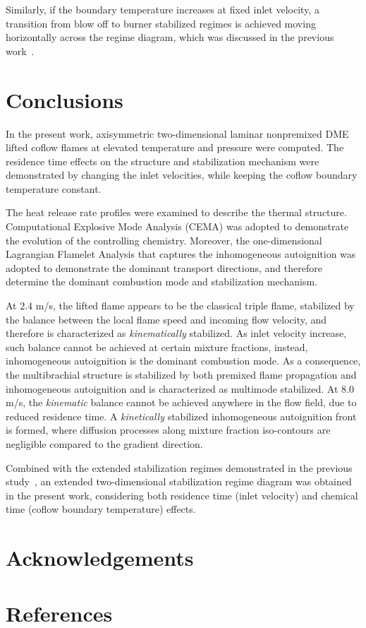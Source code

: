 \documentclass{wssci}
\begin{document}
Similarly, if the boundary temperature increases at fixed inlet velocity, a transition from blow off to burner stabilized regimes is achieved moving horizontally across the regime diagram, which was discussed in the previous work~\cite{deng15}.     


\section{Conclusions}

In the present work, axisymmetric two-dimensional laminar nonpremixed DME lifted coflow flames at elevated temperature and pressure were computed.  The residence time effects on the structure and stabilization mechanism were demonstrated by changing the inlet velocities, while keeping the coflow boundary temperature constant.

The heat release rate profiles were examined to describe the thermal structure.  Computational Explosive Mode Analysis (CEMA) was adopted to demonstrate the evolution of the controlling chemistry.  Moreover, the one-dimensional Lagrangian Flamelet Analysis that captures the inhomogeneous autoignition was adopted to demonstrate the dominant transport directions, and therefore determine the dominant combustion mode and stabilization mechanism.

At $2.4$ m/s, the lifted flame appears to be the classical triple flame, stabilized by the balance between the local flame speed and incoming flow velocity, and therefore is characterized as \emph {kinematically} stabilized.  As inlet velocity increase, such balance cannot be achieved at certain mixture fractions, instead, inhomogeneous autoignition is the dominant combustion mode.  As a consequence, the multibrachial structure is stabilized by both premixed flame propagation and inhomogeneous autoignition and is characterized as multimode stabilized.  At $8.0$ m/s, the \emph{kinematic} balance cannot be achieved anywhere in the flow field, due to reduced residence time.  A \emph {kinetically} stabilized inhomogeneous autoignition front is formed, where diffusion processes along mixture fraction iso-contours are negligible compared to the gradient direction.

Combined with the extended stabilization regimes demonstrated in the previous study~\cite{deng15}, an extended two-dimensional stabilization regime diagram was obtained in the present work, considering both residence time (inlet velocity) and chemical time (coflow boundary temperature) effects.  


\section{Acknowledgements}

\section{References}


 
\end{document}

